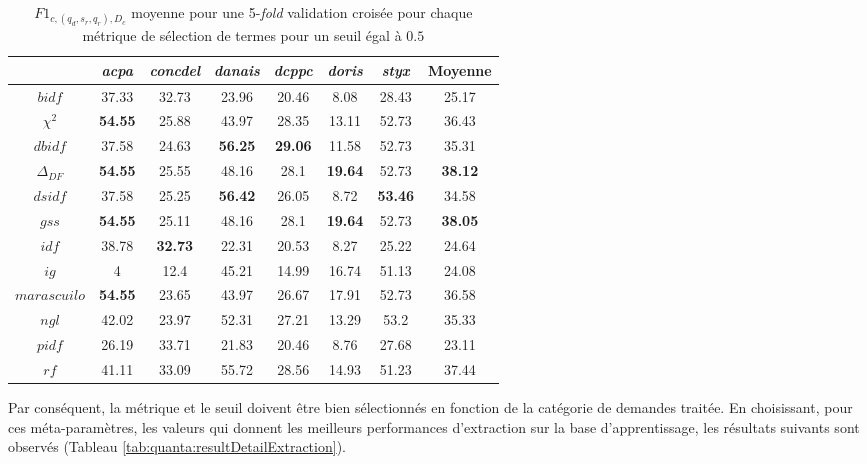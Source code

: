 \begin{table}[!htb]
	\centering \scriptsize
	\begin{tabular}{|c|c|c|c|c|c|c|c|}
		\hline
		& \textit{acpa} & \textit{concdel} & \textit{danais} & \textit{dcppc} & \textit{doris} & \textit{styx} & \textbf{Moyenne} \\ \hline
		$bidf$ & 37.33 & 32.73 & 23.96 & 20.46 & 8.08 & 28.43 & 25.17 \\ \hline
		$\chi^2$ & \textbf{54.55} & 25.88 & 43.97 & 28.35 & 13.11 & 52.73 & 36.43 \\ \hline
		$dbidf$ & 37.58 & 24.63 & \textbf{56.25} & \textbf{29.06} & 11.58 & 52.73 & 35.31 \\ \hline
		$\Delta_{DF}$ & \textbf{54.55} & 25.55 & 48.16 & 28.1 & \textbf{19.64} & 52.73 & \textbf{38.12} \\ \hline
		$dsidf$ & 37.58 & 25.25 & \textbf{56.42} & 26.05 & 8.72 & \textbf{53.46} & 34.58 \\ \hline
		$gss$ & \textbf{54.55} & 25.11 & 48.16 & 28.1 & \textbf{19.64} & 52.73 & \textbf{38.05} \\ \hline
		$idf$ & 38.78 & \textbf{32.73} & 22.31 & 20.53 & 8.27 & 25.22 & 24.64 \\ \hline
		$ig$ & 4 & 12.4 & 45.21 & 14.99 & 16.74 & 51.13 & 24.08 \\ \hline
		$marascuilo$ & \textbf{54.55} & 23.65 & 43.97 & 26.67 & 17.91 & 52.73 & 36.58 \\ \hline
		$ngl$ & 42.02 & 23.97 & 52.31 & 27.21 & 13.29 & 53.2 & 35.33 \\ \hline
		$pidf$ & 26.19 & 33.71 & 21.83 & 20.46 & 8.76 & 27.68 & 23.11 \\ \hline
		$rf$ & 41.11 & 33.09 & 55.72 & 28.56 & 14.93 & 51.23 & 37.44 \\ \hline
	\end{tabular}
\caption{$F1_{c,(q_d, s_r, q_r), D_c}$ moyenne pour une 5-\textit{fold} validation croisée pour chaque métrique de sélection de termes pour un seuil égal à $0.5$} \label{tab:quanta:compareGW}
\end{table}

Par conséquent, la métrique et le seuil doivent être bien sélectionnés en fonction de la catégorie de demandes traitée. En choisissant, pour ces méta-paramètres, les valeurs qui donnent les meilleurs performances d'extraction sur la base d'apprentissage, les résultats suivants sont observés (Tableau \ref{tab:quanta:resultDetailExtraction}).
 

